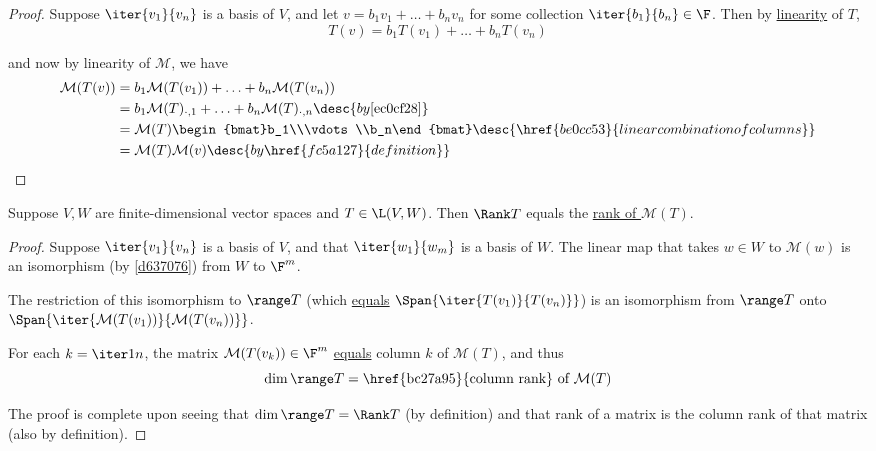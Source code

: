 \begin{proof}
  Suppose $\iter{v_1}{v_n}$ is a basis of $V$, and let $v=b_1v_1+\ldots+b_nv_n$
  for some collection $\iter{b_1}{b_n}\in\F$. Then by \href{d7d1925}{linearity}
  of $T$,
  $$
    T(v)=b_1T(v_1)+\ldots+b_nT(v_n)
  $$

  and now by linearity of $\mathcal M$, we have
  \begin{align*}
    \mathcal M(T(v)) &=b_1\mathcal M(T(v_1))+\ldots+b_n\mathcal M(T(v_n))                                                      \\
                     &=b_1\mathcal M(T)_{\cdot,1}+\ldots+b_n\mathcal M(T)_{\cdot,n}\desc{by \autoref{ec0cf28}}                 \\
                     &=\mathcal M(T)\begin{bmat}b_1\\\vdots\\b_n\end{bmat}\desc{\href{be0cc53}{linear combination of columns}} \\
                     &=\mathcal M(T)\mathcal M(v)\desc{by \href{fc5a127}{definition}}
  \end{align*}
\end{proof}

\label{b2759d6}

Suppose $V,W$ are finite-dimensional vector spaces and $T\in\L(V,W)$. Then
\href{ca0f3c2}{$\Rank T$} equals the \href{ecd3948}{rank of $\mathcal M(T)$}.

\begin{proof}
  Suppose $\iter{v_1}{v_n}$ is a basis of $V$, and that $\iter{w_1}{w_m}$ is a
  basis of $W$. The linear map that takes $w\in W$ to \href{fc5a127}{$\mathcal
  M(w)$} is an isomorphism (by \autoref{d637076}) from $W$ to $\F^m$.

  The restriction of this isomorphism to $\range T$ (which
  \href{d91179c}{equals} $\Span\{\iter{T(v_1)}{T(v_n)}\}$) is an isomorphism
  from $\range T$ onto $\Span\{\iter{\mathcal M(T(v_1))}{\mathcal
  M(T(v_n))}\}$.

  For each $k=\iter1n$, the matrix $\mathcal M(T(v_k))\in\F^{m}$
  \href{ec0cf28}{equals} column $k$ of $\mathcal M(T)$, and thus
  $$
    \dim\range T=\text{\href{bc27a95}{column rank} of }\mathcal M(T)
  $$

  The proof is complete upon seeing that $\dim\range T=\Rank T$ (by definition)
  and that rank of a matrix is the column rank of that matrix (also by
  definition).
\end{proof}
